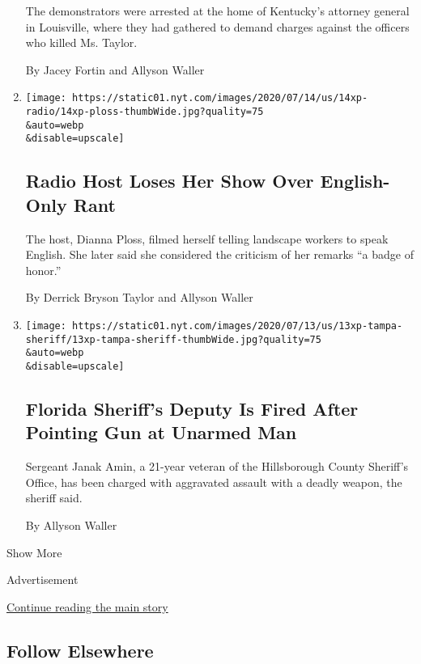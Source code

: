 \begin{enumerate}
  The demonstrators were arrested at the home of Kentucky's attorney
  general in Louisville, where they had gathered to demand charges
  against the officers who killed Ms. Taylor.

  By Jacey Fortin and Allyson Waller
\item
  \href{/2020/07/14/us/dianna-ploss-new-hampshire-radio.html}{}

  \texttt{[image: https://static01.nyt.com/images/2020/07/14/us/14xp-radio/14xp-ploss-thumbWide.jpg?quality=75\\\&auto=webp\\\&disable=upscale]}

  \hypertarget{radio-host-loses-her-show-over-english-only-rant}{%
  \subsection{Radio Host Loses Her Show Over English-Only
  Rant}\label{radio-host-loses-her-show-over-english-only-rant}}

  The host, Dianna Ploss, filmed herself telling landscape workers to
  speak English. She later said she considered the criticism of her
  remarks ``a badge of honor.''

  By Derrick Bryson Taylor and Allyson Waller
\item
  \href{/2020/07/13/us/janak-amin-hillsborough-county.html}{}

  \texttt{[image: https://static01.nyt.com/images/2020/07/13/us/13xp-tampa-sheriff/13xp-tampa-sheriff-thumbWide.jpg?quality=75\\\&auto=webp\\\&disable=upscale]}

  \hypertarget{florida-sheriffs-deputy-is-fired-after-pointing-gun-at-unarmed-man}{%
  \subsection{Florida Sheriff's Deputy Is Fired After Pointing Gun at
  Unarmed
  Man}\label{florida-sheriffs-deputy-is-fired-after-pointing-gun-at-unarmed-man}}

  Sergeant Janak Amin, a 21-year veteran of the Hillsborough County
  Sheriff's Office, has been charged with aggravated assault with a
  deadly weapon, the sheriff said.

  By Allyson Waller
\end{enumerate}

Show More

Advertisement

\protect\hyperlink{after-mid2}{Continue reading the main story}

\hypertarget{follow-elsewhere}{%
\subsection{Follow Elsewhere}\label{follow-elsewhere}}

